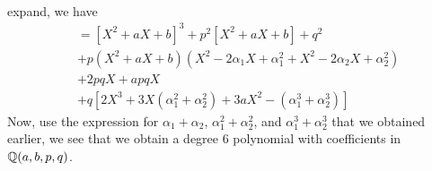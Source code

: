 \documentclass{article}
\begin{document}
\begin{homeworkProblem}
\begin{align}
\end{align}
expand, we have
\begin{align}
    & = [X^2 + aX + b]^3 + p^2 [ X^2 + aX + b] + q^2\\
    & + p(X^2 + a X + b)(X^2 -2 \alpha_1 X + \alpha_1^2 + X^2 - 2 \alpha_2 X + \alpha_2^2)\\
    & + 2pqX + apqX\\
    & + q[ 2X^3 + 3X(\alpha_1^2 + \alpha_2^2) + 3aX^2 - (\alpha_1^3 + \alpha_2^3)]
\end{align}
Now, use the expression for $\alpha_1 + \alpha_2$, $\alpha_1^2 + \alpha_2^2$, and $\alpha_1^3 + \alpha_2^3$ that we obtained earlier, we see that we obtain 
a degree 6 polynomial with coefficients in $\mathbb{Q} (a,b,p,q)$.
    
    

\end{homeworkProblem}

\pagebreak

\begin{homeworkProblem}

\end{homeworkProblem}
\end{document}
